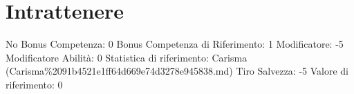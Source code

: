 \section{Intrattenere}\label{intrattenere}

\begin{description}
\tightlist
\item[Tags: ABI]
No Bonus Competenza: 0 Bonus Competenza di Riferimento: 1 Modificatore:
-5 Modificatore Abilità: 0 Statistica di riferimento: Carisma
(Carisma\%2091b4521e1ff64d669e74d3278e945838.md) Tiro Salvezza: -5
Valore di riferimento: 0
\end{description}
